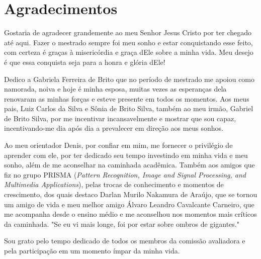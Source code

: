 \newpage
\thispagestyle{empty}
\section*{Agradecimentos}
Gostaria de agradecer grandemente ao meu Senhor Jesus Cristo por ter chegado até aqui. Fazer o mestrado sempre foi meu sonho e estar conquistando esse feito, com certeza é graças à misericórdia e graça dEle sobre a minha vida. Meu desejo é que essa conquista seja para a honra e glória dEle!

Dedico a Gabriela Ferreira de Brito que no período de mestrado me apoiou como namorada, noiva e hoje é minha esposa, muitas vezes as esperanças dela renovaram as minhas forças e esteve presente em todos os momentos. Aos meus pais, Luiz Carlos da Silva e Sônia de Brito Silva, também ao meu irmão, Gabriel de Brito Silva, por me incentivar incansavelmente e mostrar que sou capaz, incentivando-me dia após dia a prevalecer em direção aos meus sonhos.

Ao meu orientador Denis, por confiar em mim, me fornecer o privilégio de aprender com ele, por ter dedicado seu tempo investindo em minha vida e meu sonho, além de me aconselhar na caminhada acadêmica. Também aos amigos que fiz no grupo PRISMA (\textit{Pattern Recognition, Image and Signal Processing, and Multimedia Applications}), pelas trocas de conhecimento e momentos de crescimento, dos quais destaco Darlan Murilo Nakamura de Araújo, que se tornou um amigo de vida e meu melhor amigo Álvaro Leandro Cavalcante Carneiro, que me acompanha desde o ensino médio e me aconselhou nos momentos mais críticos da caminhada. "Se eu vi mais longe, foi por estar sobre ombros de gigantes."

Sou grato pelo tempo dedicado de todos os membros da comissão avaliadora e pela participação em um momento ímpar da minha vida.
